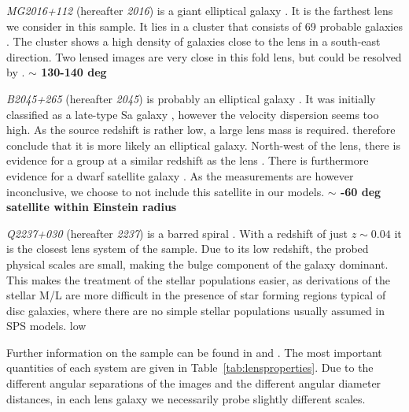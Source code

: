 \documentclass[useAMS,usenatbib]{mn2e}
\begin{document}
\textit{MG2016+112} (hereafter \textit{2016}) is a giant elliptical galaxy \citep{1984Sci...223...46L,1986AJ.....91..991S}. It is the farthest lens we consider in this sample. It lies in a cluster that consists of 69 probable galaxies \citep{2003MNRAS.344..337T}. The cluster shows a high density of galaxies close to the lens in a south-east direction. Two lensed images are very close in this fold lens, but could be resolved by \citet{2009MNRAS.394..174M}.
\textbf{$\sim$ 130-140 deg}

\textit{B2045+265} (hereafter \textit{2045}) is probably an elliptical galaxy \citep{2007MNRAS.378..109M}. It was initially classified as a late-type Sa galaxy \citep{1999AJ....117..658F}, however the velocity dispersion seems too high. As the source redshift is rather low, a large lens mass is required. \citet{2007MNRAS.378..109M} therefore conclude that it is more likely an elliptical galaxy. North-west of the lens, there is evidence for a group at a similar redshift as the lens \citep{1999AJ....117..658F}. There is furthermore evidence for a dwarf satellite galaxy \citep{2007MNRAS.378..109M}. As the measurements are however inconclusive, we choose to not include this satellite in our models.
\textbf{$\sim$ -60 deg}
\textbf{satellite within Einstein radius}

\textit{Q2237+030} (hereafter \textit{2237}) is a barred spiral \citep{1988AJ.....95.1331Y}. With a redshift of just $z\sim0.04$ it is the closest lens system of the sample. Due to its low redshift, the probed physical scales are small, making the bulge component of the galaxy dominant. This makes the treatment of the stellar populations easier, as derivations of the stellar M/L are more difficult in the presence of star forming regions typical of disc galaxies, where there are no simple stellar populations usually assumed in SPS models.
low

Further information on the sample can be found in \citet{2011ApJ...740...97L} and \citet{2012A&A...538A..99S}. The most important quantities of each system are given in Table~\ref{tab:lensproperties}. Due to the different angular separations of the images and the different angular diameter distances, in each lens galaxy we necessarily probe slightly different scales.
\end{document}

